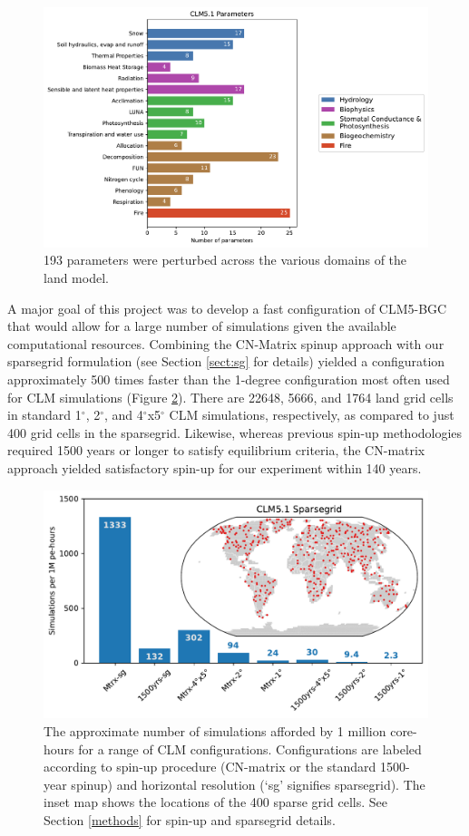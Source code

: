 \documentclass[draft]{agujournal2019}
\begin{document}
\begin{figure}[h]
\centering
\includegraphics[width=\textwidth]{../figs/bar.pdf}
\caption{193 parameters were perturbed across the various domains of the land model.}
\label{fig:params}
\end{figure}

A major goal of this project was to develop a fast configuration of CLM5-BGC that would allow for a large number of simulations given the available computational resources.
Combining the CN-Matrix spinup approach with our sparsegrid formulation (see Section \ref{sect:sg} for details) yielded a configuration approximately 500 times faster than the 1-degree configuration most often used for CLM simulations (Figure \ref{fig:sims}).
There are 22648, 5666, and 1764 land grid cells in standard 1$^{\circ}$, 2$^{\circ}$, and 4$^{\circ}$x5$^{\circ}$ CLM simulations, respectively, as compared to just 400 grid cells in the sparsegrid.
Likewise, whereas previous spin-up methodologies required 1500 years or longer to satisfy equilibrium criteria, the CN-matrix approach yielded satisfactory spin-up for our experiment within 140 years.


\begin{figure}[h]
\centering
\includegraphics[width=30pc]{../figs/sims.pdf}
\caption{The approximate number of simulations afforded by 1 million core-hours for a range of CLM configurations. Configurations are labeled according to spin-up procedure (CN-matrix or the standard 1500-year spinup) and horizontal resolution (`sg' signifies sparsegrid). The inset map shows the locations of the 400 sparse grid cells. See Section \ref{methods} for spin-up and sparsegrid details.}
\label{fig:sims}
\end{figure}
\end{document}
